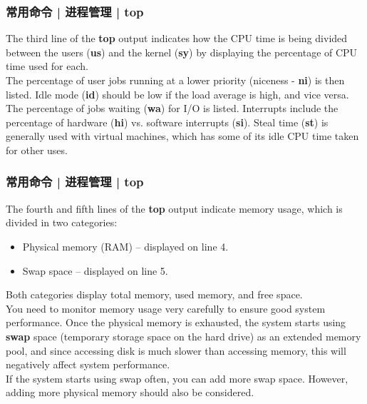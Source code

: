\begin{frame}
  \frametitle{常用命令 | 进程管理 | top}
  The third line of the \textbf{top} output indicates how the CPU time is being divided between the users (\textbf{us}) and the kernel (\textbf{sy}) by displaying the percentage of CPU time used for each.\\
  \vspace{0.3cm}
  The percentage of user jobs running at a lower priority (niceness - \textbf{ni}) is then listed. Idle mode (\textbf{id}) should be low if the load average is high, and vice versa. The percentage of jobs waiting (\textbf{wa}) for I/O is listed. Interrupts include the percentage of hardware (\textbf{hi}) vs.  software interrupts (\textbf{si}). Steal time (\textbf{st}) is generally used with virtual machines, which has some of its idle CPU time taken for other uses.
\end{frame}

\begin{frame}
  \frametitle{常用命令 | 进程管理 | top}
  The fourth and fifth lines of the \textbf{top} output indicate memory usage, which is divided in two categories:
  \begin{itemize}
    \item Physical memory (RAM) – displayed on line 4.
    \item Swap space – displayed on line 5.
  \end{itemize}
  Both categories display total memory, used memory, and free space.\\
  \vspace{0.3cm}
  You need to monitor memory usage very carefully to ensure good system performance. Once the physical memory is exhausted, the system starts using \textbf{swap} space (temporary storage space on the hard drive) as an extended memory pool, and since accessing disk is much slower than accessing memory, this will negatively affect system performance.\\
  \vspace{0.3cm}
  If the system starts using swap often, you can add more swap space. However, adding more physical memory should also be considered.
\end{frame}

